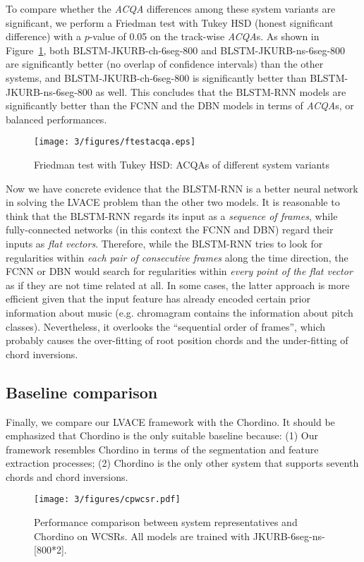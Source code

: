 To compare whether the \textit{ACQA} differences among these system variants are significant, we perform a Friedman test \cite{friedman1937use} with Tukey HSD (honest significant difference) \cite{tukey1949comparing} with a $p$-value of 0.05 on the track-wise \textit{ACQA}s. As shown in Figure~\ref{fig:3-friedmanacqa}, both BLSTM-JKURB-ch-6seg-800 and BLSTM-JKURB-ns-6seg-800 are significantly better (no overlap of confidence intervals) than the other systems, and BLSTM-JKURB-ch-6seg-800 is significantly better than BLSTM-JKURB-ns-6seg-800 as well. This concludes that the BLSTM-RNN models are significantly better than the FCNN and the DBN models in terms of \textit{ACQA}s, or balanced performances.
\begin{figure}[h!]
	\centering
	\texttt{[image: 3/figures/ftestacqa.eps]}
	\caption{Friedman test with Tukey HSD: ACQAs of different system variants}
	\label{fig:3-friedmanacqa}
\end{figure}

Now we have concrete evidence that the BLSTM-RNN is a better neural network in solving the LVACE problem than the other two models. It is reasonable to think that the BLSTM-RNN regards its input as a {\it sequence of frames}, while fully-connected networks (in this context the FCNN and DBN) regard their inputs as \textit{flat vectors}. Therefore, while the BLSTM-RNN tries to look for regularities within \textit{each pair of consecutive frames} along the time direction, the FCNN or DBN would search for regularities within \textit{every point of the flat vector} as if they are not time related at all. In some cases, the latter approach is more efficient given that the input feature has already encoded certain prior information about music (e.g. chromagram contains the information about pitch classes). Nevertheless, it overlooks the ``sequential order of frames'', which probably causes the over-fitting of root position chords and the under-fitting of chord inversions.

\subsection{Baseline comparison} \label{sec:3-p9}
Finally, we compare our LVACE framework with the Chordino. It should be emphasized that Chordino is the only suitable baseline because: (1) Our framework resembles Chordino in terms of the segmentation and feature extraction processes; (2) Chordino is the only other system that supports seventh chords and chord inversions.
\begin{figure}[h!]
	\centering
	\texttt{[image: 3/figures/cpwcsr.pdf]}
	\caption{Performance comparison between system representatives and Chordino on WCSRs. All models are trained with JKURB-6seg-ns-[800*2].}
	\label{fig:3-compchordino}
\end{figure}

